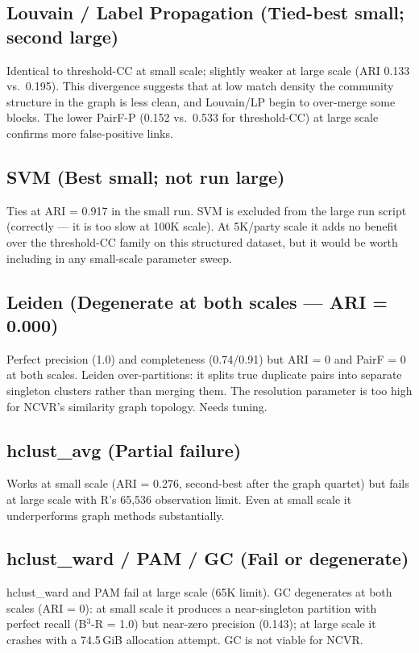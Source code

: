 \documentclass[11pt, a4paper]{article}
\begin{document}
\subsection*{Louvain / Label Propagation (Tied-best small; second large)}
Identical to threshold-CC at small scale; slightly weaker at large scale
(ARI 0.133 vs.\ 0.195). This divergence suggests that at low match density
the community structure in the graph is less clean, and Louvain/LP begin to
over-merge some blocks. The lower PairF-P (0.152 vs.\ 0.533 for threshold-CC)
at large scale confirms more false-positive links.

\subsection*{SVM (Best small; not run large)}
Ties at ARI = 0.917 in the small run. SVM is excluded from the large run
script (correctly --- it is too slow at 100K scale). At 5K/party scale it
adds no benefit over the threshold-CC family on this structured dataset, but
it would be worth including in any small-scale parameter sweep.

\subsection*{Leiden (Degenerate at both scales --- ARI = 0.000)}
Perfect precision (1.0) and completeness (0.74/0.91) but ARI = 0 and PairF = 0
at both scales. Leiden over-partitions: it splits true duplicate pairs into
separate singleton clusters rather than merging them. The resolution parameter
is too high for NCVR's similarity graph topology. Needs tuning.

\subsection*{hclust\_avg (Partial failure)}
Works at small scale (ARI = 0.276, second-best after the graph quartet) but
fails at large scale with R's 65,536 observation limit. Even at small scale
it underperforms graph methods substantially.

\subsection*{hclust\_ward / PAM / GC (Fail or degenerate)}
hclust\_ward and PAM fail at large scale (65K limit). GC degenerates at both
scales (ARI = 0): at small scale it produces a near-singleton partition with
perfect recall (B$^3$-R = 1.0) but near-zero precision (0.143); at large scale
it crashes with a 74.5\,GiB allocation attempt. GC is not viable for NCVR.
\end{document}

